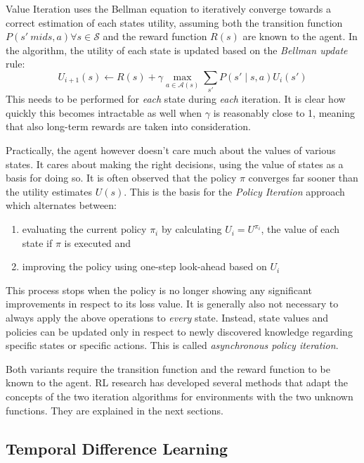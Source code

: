 Value Iteration uses the Bellman equation to iteratively converge towards a correct estimation of each states utility,
assuming both the transition function $P(s' \ mid s,a) \forall s \in \mathcal{S}$ and the reward function $R(s)$ are
known to the agent.  
In the algorithm, the utility of each state is updated based on the \emph{Bellman update} rule:
\[
U_{i+1}(s) \gets R(s) + \gamma \max_{a \in \mathcal{A}(s)} \sum_{s'}{P(s' \mid s,a) U_i(s')}
\]
This needs to be performed for \emph{each} state during \emph{each} iteration. It is clear how quickly this becomes
intractable as well when $\gamma$ is reasonably close to 1, meaning that also long-term rewards are taken into
consideration. 

Practically, the agent however doesn't care much about the values of various states. It cares about making the right
decisions, using the value of states as a basis for doing so. It is often observed that the policy $\pi$ converges far
sooner than the utility estimates $U(s)$. This is the basis for the \emph{Policy Iteration} approach which alternates
between: 
\begin{enumerate}
	\item evaluating the current policy $\pi_i$ by calculating $U_i=U^{\pi_i}$, the value of each state if $\pi$ is
	executed and 
	\item improving the policy using one-step look-ahead based on $U_i$
\end{enumerate}

This process stops when the policy is no longer showing any significant improvements in respect to its loss value. It is
generally also not necessary to always apply the above operations to \emph{every} state. Instead, state values and
policies can be updated only in respect to newly discovered knowledge regarding specific states or specific actions.
This is called \emph{asynchronous policy iteration}. 

Both variants require the transition function and the reward function to be known to the agent. \ac {RL} research has
developed several methods that adapt the concepts of the two iteration algorithms for environments with the two unknown
functions. They are explained in the next sections. 

\subsection{Temporal Difference Learning}%
\label{sub:temporal_difference_learning}

